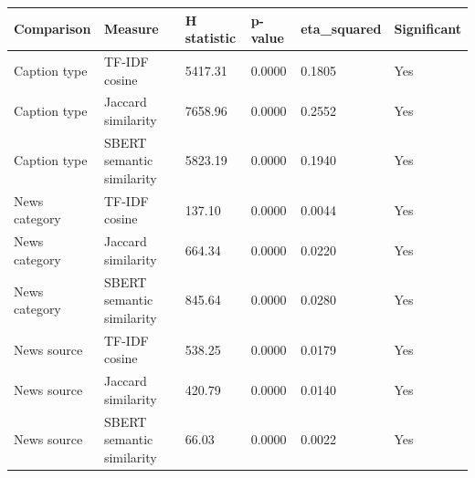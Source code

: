 \begin{tabular}{llllll}
\toprule
Comparison & Measure & H statistic & p-value & eta\_squared & Significant \\
\midrule
Caption type & TF-IDF cosine & 5417.31 & 0.0000 & 0.1805 & Yes \\
Caption type & Jaccard similarity & 7658.96 & 0.0000 & 0.2552 & Yes \\
Caption type & SBERT semantic similarity & 5823.19 & 0.0000 & 0.1940 & Yes \\
News category & TF-IDF cosine & 137.10 & 0.0000 & 0.0044 & Yes \\
News category & Jaccard similarity & 664.34 & 0.0000 & 0.0220 & Yes \\
News category & SBERT semantic similarity & 845.64 & 0.0000 & 0.0280 & Yes \\
News source & TF-IDF cosine & 538.25 & 0.0000 & 0.0179 & Yes \\
News source & Jaccard similarity & 420.79 & 0.0000 & 0.0140 & Yes \\
News source & SBERT semantic similarity & 66.03 & 0.0000 & 0.0022 & Yes \\
\bottomrule
\end{tabular}
